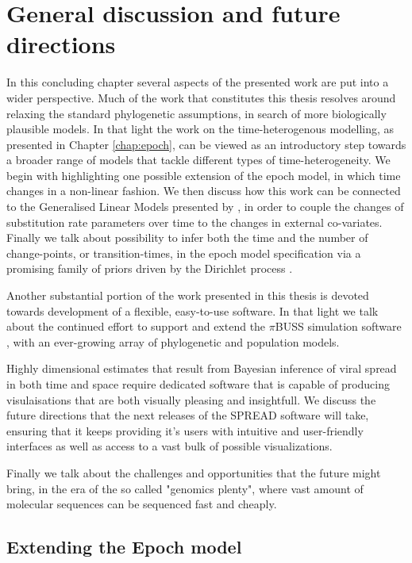 \chapter{General discussion and future directions}

In this concluding chapter several aspects of the presented work are put into a wider perspective.
Much of the work that constitutes this thesis resolves around relaxing the standard phylogenetic assumptions, in search of more biologically plausible models. 
In that light the work on the time-heterogenous modelling, as presented in Chapter \ref{chap:epoch}, can be viewed as an introductory step towards a broader range of models that tackle different types of time-heterogeneity.
We begin with highlighting one possible extension of the epoch model, in which time changes in a non-linear fashion.
We then discuss how this work can be connected to the Generalised Linear Models presented by \citet{Lemey2014}, in order to couple the changes of substitution rate parameters over time to the changes in external co-variates.
Finally we talk about possibility to infer both the time and the number of change-points, or transition-times, in the epoch model specification via a promising family of priors driven by the Dirichlet process \citep{Ferguson1973}. 

Another substantial portion of the work presented in this thesis is devoted towards development of a flexible, easy-to-use software.
In that light we talk about the continued effort to support and extend the $\pi$BUSS simulation software \citep{bielejec2014}, with an ever-growing array of phylogenetic and population models.

Highly dimensional estimates that result from Bayesian inference of viral spread in both time and space require dedicated software that is capable of producing visulaisations that are both visually pleasing and insightfull.
We discuss the future directions that the next releases of the SPREAD software \citep{Bielejec2011} will take, ensuring that it keeps providing it's users with intuitive and user-friendly interfaces as well as access to a vast bulk of possible visualizations.

Finally we talk about the challenges and opportunities that the future might bring, in the era of the so called "genomics plenty", where vast amount of molecular sequences can be sequenced fast and cheaply.

\section{Extending the Epoch model}

